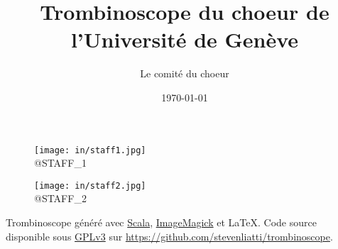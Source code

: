 \documentclass{article}
\begin{document}
\title{Trombinoscope du choeur de l'Université de Genève}
\author{Le comité du choeur}
\date{\today}
\maketitle

\begin{figure}[h!]
    \begin{center}
        \texttt{[image: in/staff1.jpg]}
        \\
        @STAFF_1
    \end{center}
\end{figure}
\begin{figure}[h!]
    \begin{center}
        \texttt{[image: in/staff2.jpg]}
        \\
        @STAFF_2
    \end{center}
\end{figure}

\bigbreak

\begin{center}
    Trombinoscope généré avec \href{https://www.scala-lang.org/}{Scala}, \href{https://imagemagick.org/}{ImageMagick} et \LaTeX.
    \bigbreak
    Code source disponible sous \href{https://www.gnu.org/licenses/gpl-3.0.fr.html}{GPLv3} sur \url{https://github.com/stevenliatti/trombinoscope}.
\end{center}

\newpage



\newpage
\end{document}
